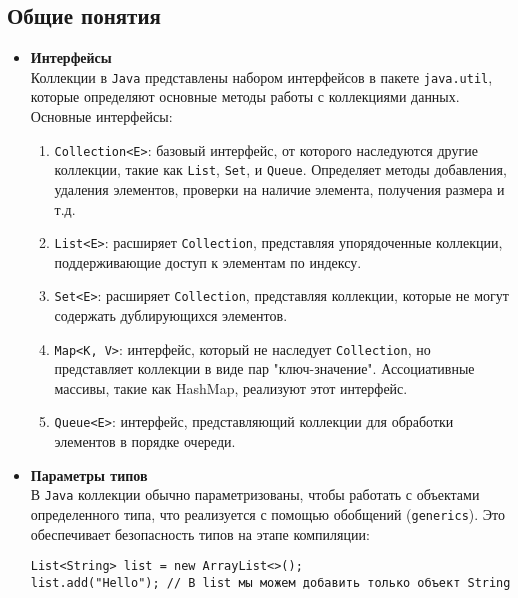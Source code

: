 \subsection{Общие понятия}
\begin{itemize}
    \item \textbf{Интерфейсы} \\
    Коллекции в \texttt{Java} представлены набором интерфейсов в пакете \texttt{java.util}, которые определяют основные методы работы с коллекциями данных. Основные интерфейсы:
    
    \begin{enumerate}
        \item \texttt{Collection<E>}: базовый интерфейс, от которого наследуются другие коллекции, такие как \texttt{List}, \texttt{Set}, и \texttt{Queue}. Определяет методы добавления, удаления элементов, проверки на наличие элемента, получения размера и т.д.
        
        \item \texttt{List<E>}: расширяет \texttt{Collection}, представляя упорядоченные коллекции, поддерживающие доступ к элементам по индексу.
        
        \item \texttt{Set<E>}: расширяет \texttt{Collection}, представляя коллекции, которые не могут содержать дублирующихся элементов.
        
        \item \texttt{Map<K, V>}: интерфейс, который не наследует \texttt{Collection}, но представляет коллекции в виде пар "ключ-значение". Ассоциативные массивы, такие как HashMap, реализуют этот интерфейс.
        
        \item \texttt{Queue<E>}: интерфейс, представляющий коллекции для обработки элементов в порядке очереди.
    \end{enumerate}
    
    \item \textbf{Параметры типов} \\
    В \texttt{Java} коллекции обычно параметризованы, чтобы работать с объектами определенного типа, что реализуется с помощью обобщений (\texttt{generics}). Это обеспечивает безопасность типов на этапе компиляции:

    \begin{verbatim}
List<String> list = new ArrayList<>();
list.add("Hello"); // В list мы можем добавить только объект String
    \end{verbatim}
    

\end{itemize}

